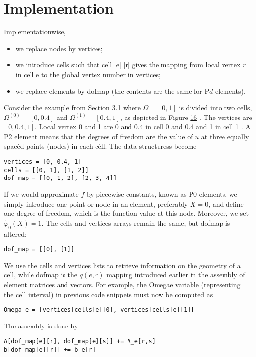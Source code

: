 \documentclass[../main.tex]{subfiles}
\begin{document}
\section[Implementation]{Implementation}
\label{sec:sec_6_3}
\noindent Implementationwise,
\begin{itemize}
	\item we replace nodes by vertices;
	\item we introduce cells such that cell [e] [r] gives the mapping from local vertex $r$ in cell e to the global vertex number in vertices;
	\item we replace elements by dof\textunderscore map (the contents are the same for $\mathrm{P} d$ elements).
\end{itemize}

\noindent Consider the example from Section \hyperref[sec:sec_3_1]{3.1} where $\Omega=[0,1]$ is divided into two cells, $\Omega^{(0)}=[0,0.4]$ and $\Omega^{(1)}=[0.4,1]$, as depicted in Figure \hyperref[fig:img_16]{16} . The vertices are $[0,0.4,1]$. Local vertex 0 and 1 are 0 and $0.4$ in cell 0 and $0.4$ and 1 in cell 1 . A P2 element means that the degrees of freedom are the value of $u$ at three equally spacèd points (nodes) in each céll. The data structuress become
\begin{lstlisting}[numbers=none]
vertices = [0, 0.4, 1]
cells = [[0, 1], [1, 2]]
dof_map = [[0, 1, 2], [2, 3, 4]]	
\end{lstlisting}
If we would approximate $f$ by piecewise constants, known as $\mathrm{P} 0$ elements, we simply introduce one point or node in an element, preferably $X=0$, and define one degree of freedom, which is the function value at this node. Moreover, we set $\tilde{\varphi}_{0}(X)=1$. The cells and vertices arrays remain the same, but dof\textunderscore map is altered:
\begin{lstlisting}[numbers=none]
dof_map = [[0], [1]]	
\end{lstlisting}
We use the cells and vertices lists to retrieve information on the geometry of a cell, while dof\textunderscore map is the $q(e, r)$ mapping introduced earlier in the assembly of element matrices and vectors. For example, the Omega\textunderscore e variable (representing the cell interval) in previous code snippets must now be computed as
\begin{lstlisting}[numbers=none]
Omega_e = [vertices[cells[e][0], vertices[cells[e][1]]	
\end{lstlisting}
The assembly is done by
\begin{lstlisting}[numbers=none]
A[dof_map[e][r], dof_map[e][s]] += A_e[r,s]
b[dof_map[e][r]] += b_e[r]	
\end{lstlisting}
\end{document}
